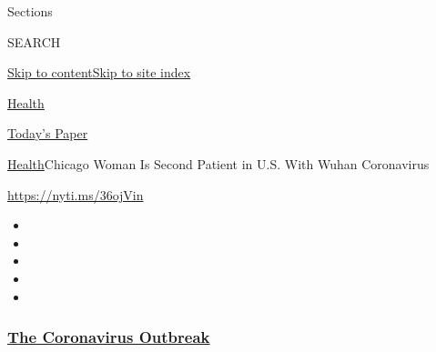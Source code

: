 Sections

SEARCH

\protect\hyperlink{site-content}{Skip to
content}\protect\hyperlink{site-index}{Skip to site index}

\href{https://www.nytimes3xbfgragh.onion/section/health}{Health}

\href{https://myaccount.nytimes3xbfgragh.onion/auth/login?response_type=cookie\&client_id=vi}{}

\href{https://www.nytimes3xbfgragh.onion/section/todayspaper}{Today's
Paper}

\href{/section/health}{Health}\textbar{}Chicago Woman Is Second Patient
in U.S. With Wuhan Coronavirus

\url{https://nyti.ms/36ojVin}

\begin{itemize}
\item
\item
\item
\item
\item
\end{itemize}

\hypertarget{the-coronavirus-outbreak}{%
\subsubsection{\texorpdfstring{\href{https://www.nytimes3xbfgragh.onion/news-event/coronavirus?name=styln-coronavirus-national\&region=TOP_BANNER\&block=storyline_menu_recirc\&action=click\&pgtype=Article\&impression_id=be1d1c90-f2b6-11ea-906f-138457fe2f11\&variant=undefined}{The
Coronavirus
Outbreak}}{The Coronavirus Outbreak}}\label{the-coronavirus-outbreak}}

